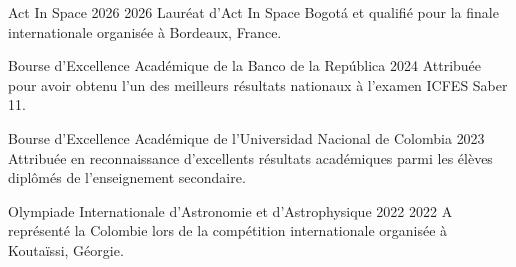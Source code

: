 \cvsection{\AwardsLabel}

\cvaward
{Act In Space 2026}
{2026}
{Lauréat d’Act In Space Bogotá et qualifié pour la finale internationale organisée à Bordeaux, France.}

\cvaward
{Bourse d'Excellence Académique de la Banco de la República}
{2024}
{Attribuée pour avoir obtenu l'un des meilleurs résultats nationaux à l'examen ICFES Saber 11.}

\cvaward
{Bourse d'Excellence Académique de l'Universidad Nacional de Colombia}
{2023}
{Attribuée en reconnaissance d'excellents résultats académiques parmi les élèves diplômés de l'enseignement secondaire.}

\cvaward
{Olympiade Internationale d'Astronomie et d'Astrophysique 2022}
{2022}
{A représenté la Colombie lors de la compétition internationale organisée à Koutaïssi, Géorgie.}